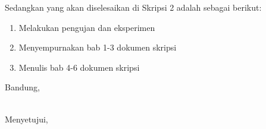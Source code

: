 \documentclass[a4paper,twoside]{article}
\begin{document}
Sedangkan yang akan diselesaikan di Skripsi 2 adalah sebagai berikut:
\begin{enumerate}
	\item Melakukan pengujan dan eksperimen
	\item Menyempurnakan bab 1-3 dokumen skripsi
	\item Menulis bab 4-6 dokumen skripsi
\end{enumerate}

\vspace{1cm}
\centering Bandung, \tanggal\\
\vspace{2cm} \nama \\ 
\vspace{1cm}

Menyetujui, \\
\end{document}
